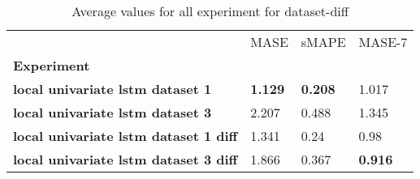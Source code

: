 \begin{table}[H]
\centering
\caption{Average values for all experiment for dataset-diff}
\label{table:Average-metric-dataset-diff}
\begin{tabular}{llll}
\toprule
{} &            MASE &           sMAPE &          MASE-7 \\
\textbf{Experiment                          } &                 &                 &                 \\
\midrule
\textbf{local univariate lstm dataset 1     } &  \textbf{1.129} &  \textbf{0.208} &           1.017 \\
\textbf{local univariate lstm dataset 3     } &           2.207 &           0.488 &           1.345 \\
\textbf{local univariate lstm dataset 1 diff} &           1.341 &            0.24 &            0.98 \\
\textbf{local univariate lstm dataset 3 diff} &           1.866 &           0.367 &  \textbf{0.916} \\
\bottomrule
\end{tabular}
\end{table}
